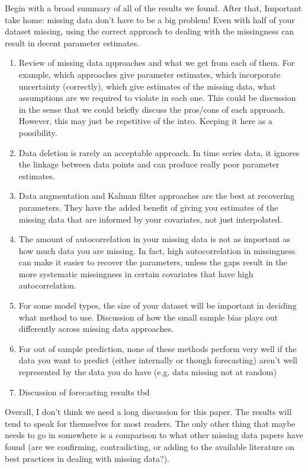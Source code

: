
Begin with a broad summary of all of the results we found. After that, 
Important take home: missing data don't have to be a big problem! Even with half of your dataset missing, using the correct approach to dealing with the missingness can result in decent parameter estimates.

\begin{enumerate}
    
    \item Review of missing data approaches and what we get from each of them. For example, which approaches give parameter estimates, which incorporate uncertainty (correctly), which give estimates of the missing data, what assumptions are we required to violate in each one. This could be discussion in the sense that we could briefly discuss the pros/cons of each approach. However, this may just be repetitive of the intro. Keeping it here as a possibility. 

    \item Data deletion is rarely an acceptable approach. In time series data, it ignores the linkage between data points and can produce really poor parameter estimates.
    
    \item Data augmentation and Kalman filter approaches are the best at recovering parameters. They have the added benefit of giving you estimates of the missing data that are informed by your covariates, not just interpolated. 

    \item The amount of autocorrelation in your missing data is not as important as how much data you are missing. In fact, high autocorrelation in missingness can make it easier to recover the parameters, unless the gaps result in the more systematic missingness in certain covariates that have high autocorrelation.
    
    \item For some model types, the size of your dataset will be important in deciding what method to use. Discussion of how the small sample bias plays out differently across missing data approaches.
    
    \item For out of sample prediction, none of these methods perform very well if the data you want to predict (either internally or though forecasting) aren't well represented by the data you do have (e.g. data missing not at random)
    
    \item Discussion of forecasting results tbd

\end{enumerate}

Overall, I don't think we need a long discussion for this paper. The results will tend to speak for themselves for most readers. The only other thing that maybe needs to go in somewhere is a comparison to what other missing data papers have found (are we confirming, contradicting, or adding to the available literature on best practices in dealing with missing data?).
